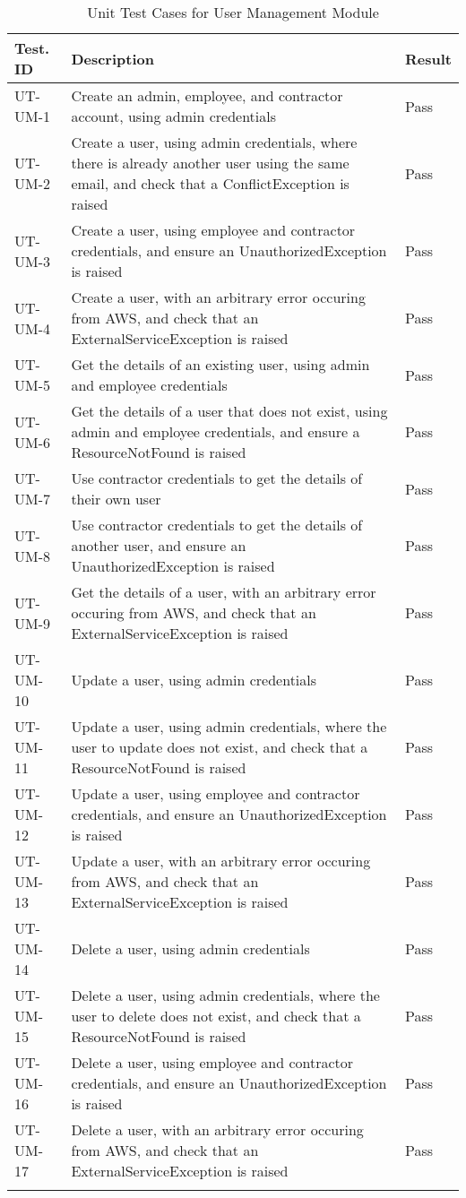 \documentclass[12pt, titlepage]{article}
\begin{document}
\begin{longtable}{|m{2cm}|m{10cm}|m{1.4cm}|}
  \hline
  \textbf{Test. ID} & \textbf{Description} & \textbf{Result} \\ \hline
  UT-UM-1 & Create an admin, employee, and contractor account, using
  admin credentials & Pass\\ \hline
  UT-UM-2 & Create a user, using admin credentials, where there is
  already another user using the same email, and check that a
  ConflictException is raised & Pass\\ \hline
  UT-UM-3 & Create a user, using employee and contractor credentials,
  and ensure an UnauthorizedException is raised & Pass\\ \hline
  UT-UM-4 & Create a user, with an arbitrary error occuring from AWS,
  and check that an ExternalServiceException is raised & Pass\\ \hline
  UT-UM-5 & Get the details of an existing user, using admin and
  employee credentials & Pass\\ \hline
  UT-UM-6 & Get the details of a user that does not exist, using
  admin and employee credentials, and ensure a ResourceNotFound is
  raised & Pass\\ \hline
  UT-UM-7 & Use contractor credentials to get the details of their
  own user & Pass\\ \hline
  UT-UM-8 & Use contractor credentials to get the details of another
  user, and ensure an UnauthorizedException is raised & Pass\\ \hline
  UT-UM-9 & Get the details of a user, with an arbitrary error
  occuring from AWS, and check that an ExternalServiceException is
  raised & Pass\\ \hline
  UT-UM-10 & Update a user, using admin credentials & Pass\\ \hline
  UT-UM-11 & Update a user, using admin credentials, where the user
  to update does not exist, and check that a ResourceNotFound is
  raised & Pass\\ \hline
  UT-UM-12 & Update a user, using employee and contractor
  credentials, and ensure an UnauthorizedException is raised & Pass\\ \hline
  UT-UM-13 & Update a user, with an arbitrary error occuring from
  AWS, and check that an ExternalServiceException is raised & Pass\\ \hline
  UT-UM-14 & Delete a user, using admin credentials & Pass\\ \hline
  UT-UM-15 & Delete a user, using admin credentials, where the user
  to delete does not exist, and check that a ResourceNotFound is
  raised & Pass\\ \hline
  UT-UM-16 & Delete a user, using employee and contractor
  credentials, and ensure an UnauthorizedException is raised & Pass\\ \hline
  UT-UM-17 & Delete a user, with an arbitrary error occuring from
  AWS, and check that an ExternalServiceException is raised & Pass\\ \hline
  \caption{Unit Test Cases for User Management Module}
\end{longtable}
\end{document}
